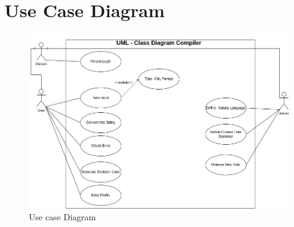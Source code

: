 \documentclass[12pt,a4paper]{article}
\begin{document}
    \section{Use Case Diagram}

    \begin{figure}[h]
        \centering
      \includegraphics[width=\textwidth]{Diagram/use case diagram.png}
      \caption{Use case Diagram}
    \end{figure}

\end{document}
